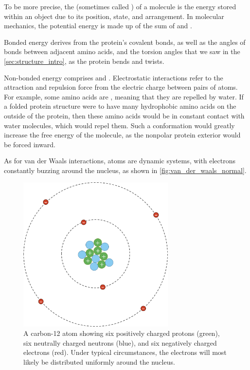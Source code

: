 {To be more precise, the  (sometimes called ) of a molecule is the energy stored within an object due to its position, state, and arrangement. In molecular mechanics, the potential energy is made up of the sum of  and .

Bonded energy derives from the protein's covalent bonds, as well as the angles of bonds between adjacent amino acids, and the torsion angles that we saw in the \autoref{sec:structure_intro}, as the protein bends and twists.

Non-bonded energy comprises  and . Electrostatic interactions refer to the attraction and repulsion force from the electric charge between pairs of atoms. For example, some amino acids are , meaning that they are repelled by water. If a folded protein structure were to have many hydrophobic amino acids on the outside of the protein, then these amino acids would be in constant contact with water molecules, which would repel them. Such a conformation would greatly increase the free energy of the molecule, as the nonpolar protein exterior would be forced inward.

As for van der Waals interactions, atoms are dynamic systems, with electrons constantly buzzing around the nucleus, as shown in \autoref{fig:van_der_waals_normal}.

\begin{figure}[h]
	\centering
	\mySfFamily
	\includegraphics[width = 0.7\textwidth]{../images/van_der_waals_normal.png}
	\caption{A carbon-12 atom showing six positively charged protons (green), six neutrally charged neutrons (blue), and six negatively charged electrons (red). Under typical circumstances, the electrons will most likely be distributed uniformly around the nucleus.}
	\label{fig:van_der_waals_normal}
\end{figure}

}
